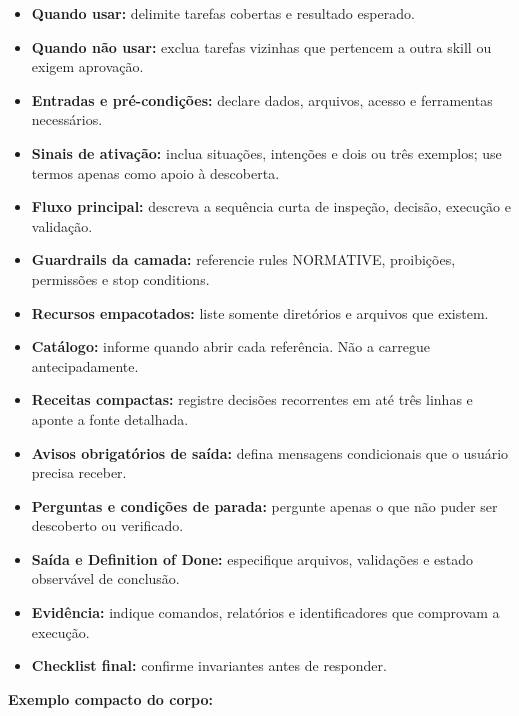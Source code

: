 \documentclass[
  10pt,
  a4paper,
  oneside]{book}
\providecommand{\tightlist}{%
  \setlength{\itemsep}{0pt}\setlength{\parskip}{0pt}}
\begin{document}
\begin{itemize}
\tightlist
\item
  \textbf{Quando usar:} delimite tarefas cobertas e resultado esperado.
\item
  \textbf{Quando não usar:} exclua tarefas vizinhas que pertencem a
  outra skill ou exigem aprovação.
\item
  \textbf{Entradas e pré-condições:} declare dados, arquivos, acesso e
  ferramentas necessários.
\item
  \textbf{Sinais de ativação:} inclua situações, intenções e dois ou
  três exemplos; use termos apenas como apoio à descoberta.
\item
  \textbf{Fluxo principal:} descreva a sequência curta de inspeção,
  decisão, execução e validação.
\item
  \textbf{Guardrails da camada:} referencie rules NORMATIVE, proibições,
  permissões e stop conditions.
\item
  \textbf{Recursos empacotados:} liste somente diretórios e arquivos que
  existem.
\item
  \textbf{Catálogo:} informe quando abrir cada referência. Não a
  carregue antecipadamente.
\item
  \textbf{Receitas compactas:} registre decisões recorrentes em até três
  linhas e aponte a fonte detalhada.
\item
  \textbf{Avisos obrigatórios de saída:} defina mensagens condicionais
  que o usuário precisa receber.
\item
  \textbf{Perguntas e condições de parada:} pergunte apenas o que não
  puder ser descoberto ou verificado.
\item
  \textbf{Saída e Definition of Done:} especifique arquivos, validações
  e estado observável de conclusão.
\item
  \textbf{Evidência:} indique comandos, relatórios e identificadores que
  comprovam a execução.
\item
  \textbf{Checklist final:} confirme invariantes antes de responder.
\end{itemize}

\textbf{Exemplo compacto do corpo:}
\end{document}
